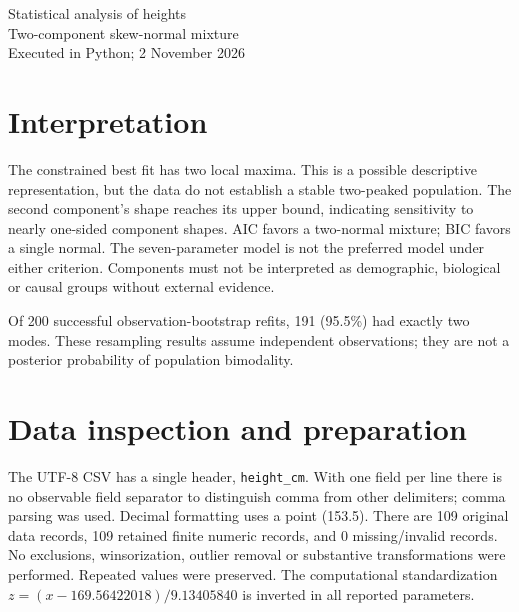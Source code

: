 \documentclass[11pt,a4paper]{article}
\begin{document}
\begin{center}{\LARGE Statistical analysis of heights}\\[5pt]
{\large Two-component skew-normal mixture}\\[4pt]
Executed in Python; 2 November 2026\end{center}
\section*{Interpretation}
The constrained best fit has two local maxima. This is a possible descriptive
representation, but the data do not establish a stable two-peaked population.
The second component's shape reaches its upper bound, indicating sensitivity
to nearly one-sided component shapes. AIC favors a two-normal mixture; BIC
favors a single normal. The seven-parameter model is not the preferred model
under either criterion. Components must not be interpreted as demographic,
biological or causal groups without external evidence.

Of 200 successful observation-bootstrap refits, 191 (95.5\%) had exactly two modes. These resampling results assume independent observations; they are not a posterior probability of population bimodality.

\section*{Data inspection and preparation}
The UTF-8 CSV has a single header, \texttt{height\_cm}. With one field per line there is no observable field separator to distinguish comma from other delimiters; comma parsing was used. Decimal formatting uses a point (153.5). There are 109 original data records, 109 retained finite numeric records, and 0 missing/invalid records. No exclusions, winsorization, outlier removal or substantive transformations were performed. Repeated values were preserved. The computational standardization $z=(x-169.56422018)/9.13405840$ is inverted in all reported parameters.
\end{document}
